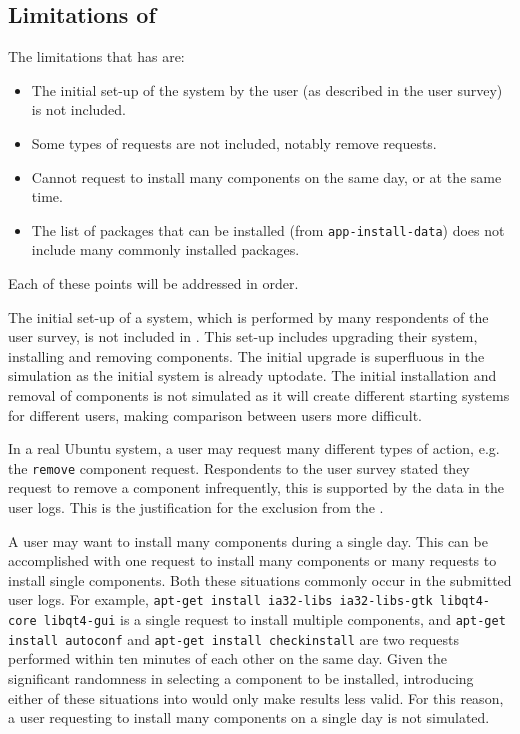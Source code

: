 \subsection{Limitations of \usermodel}
The limitations that \usermodel has are:
\begin{itemize}
  \item The initial set-up of the system by the user (as described in the user survey) is not included.
  \item Some types of requests are not included, notably remove requests.
  \item Cannot request to install many components on the same day, or at the same time.
  \item The list of packages that can be installed (from \texttt{app-install-data}) does not include many commonly installed packages.
\end{itemize}
Each of these points will be addressed in order.

The initial set-up of a system, which is performed by many respondents of the user survey, is not included in \usermodel.
This set-up includes upgrading their system, installing and removing components.
The initial upgrade is superfluous in the simulation as the initial system is already uptodate.
The initial installation and removal of components is not simulated as it will create different starting systems for different users,
making comparison between users more difficult.

In a real Ubuntu system, a user may request many different types of action, e.g. the \texttt{remove} component request.
Respondents to the user survey stated they request to remove a component infrequently, this is supported by the data in the user logs.
This is the justification for the exclusion from the \usermodel.

A user may want to install many components during a single day.
This can be accomplished with one request to install many components or many requests to install single components.
Both these situations commonly occur in the submitted user logs.
For example, \texttt{apt-get install ia32-libs ia32-libs-gtk libqt4-core libqt4-gui} is a single request to install multiple components,
and  \texttt{apt-get install autoconf} and \texttt{apt-get install checkinstall} are two requests performed within ten minutes of each other on the same day.
Given the significant randomness in selecting a component to be installed, introducing either of these situations into \usermodel would only make results less valid.
For this reason, a user requesting to install many components on a single day is not simulated.


